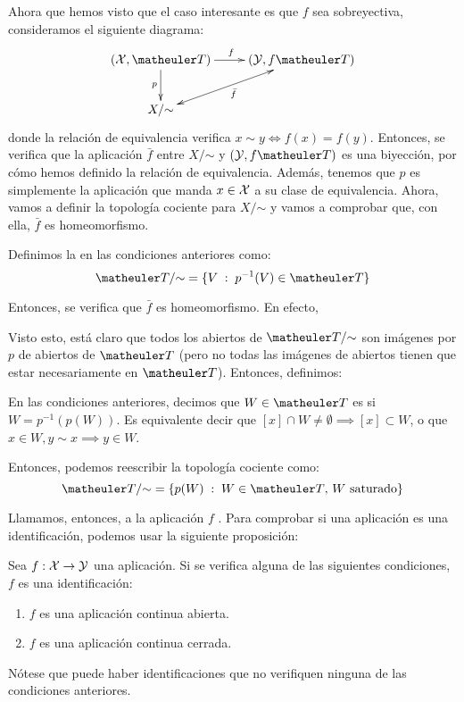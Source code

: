 


Ahora que hemos visto que el caso interesante es que $f$ sea sobreyectiva, consideramos el siguiente diagrama:
\[\xymatrix{
(\X,\T) \ar[r]^{f} \ar[d]_{p} &
(\mc{Y}, f\T) \ar@{<->}[ld]^{\bar{f}} \\
X/\mathord{\sim}
}\]
donde la relación de equivalencia verifica $x\sim y\iff f(x)=f(y)$. Entonces, se verifica que la aplicación $\bar{f}$ entre $X/\mathord{\sim}$ y $(\mc{Y},f\T)$ es una biyección, por cómo hemos definido la relación de equivalencia. Además, tenemos que $p$ es simplemente la aplicación que manda $x\in\mathcal{X}$ a su clase de equivalencia. Ahora, vamos a definir la topología cociente para $X/\mathord{\sim}$ y vamos a comprobar que, con ella, $\bar{f}$ es homeomorfismo.

\begin{defi}
Definimos la  en las condiciones anteriores como:
\[\T/\mathord{\sim} = \{V\midc p^{-1}(V)\in\T\}\]
\end{defi}

Entonces, se verifica que $\bar{f}$ es homeomorfismo. En efecto, 

Visto esto, está claro que todos los abiertos de $\T/\mathord{\sim}$ son imágenes por $p$ de abiertos de $\T$ (pero no todas las imágenes de abiertos tienen que estar necesariamente en $\T$). Entonces, definimos:

\begin{defi}
En las condiciones anteriores, decimos que $W\in\T$ es  si $W=p^{-1}(p(W))$. Es equivalente decir que $[x]\cap W\neq\emptyset\implies [x]\subset W$, o que $x\in W,y\sim x\implies y\in W$.
\end{defi}

Entonces, podemos reescribir la topología cociente como:
\[\T/\mathord{\sim} = \{p(W)\midc W\in\T\text{, } W\text{ saturado}\}\]

Llamamos, entonces, a la aplicación $f$ . Para comprobar si una aplicación es una identificación, podemos usar la siguiente proposición:

\begin{prop}
Sea $f:\mathcal{X}\to\mathcal{Y}$ una aplicación. Si se verifica alguna de las siguientes condiciones, $f$ es una identificación:
\begin{enumerate}
\item $f$ es una aplicación continua abierta.
\item $f$ es una aplicación continua cerrada.
\end{enumerate}
\end{prop}

\begin{obs}
Nótese que puede haber identificaciones que no verifiquen ninguna de las condiciones anteriores.
\end{obs}